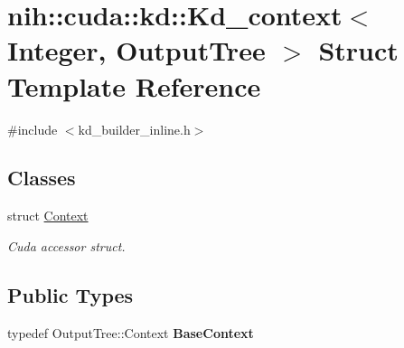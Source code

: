 \hypertarget{structnih_1_1cuda_1_1kd_1_1_kd__context}{
\section{nih\-:\-:cuda\-:\-:kd\-:\-:\-Kd\-\_\-context$<$ \-Integer, \-Output\-Tree $>$ \-Struct \-Template \-Reference}
\label{structnih_1_1cuda_1_1kd_1_1_kd__context}
}


{\ttfamily \#include $<$kd\-\_\-builder\-\_\-inline.\-h$>$}

\subsection*{\-Classes}
\begin{DoxyCompactItemize}
\item 
struct \hyperlink{structnih_1_1cuda_1_1kd_1_1_kd__context_1_1_context}{\-Context}
\begin{DoxyCompactList}\small\item\em \-Cuda accessor struct. \end{DoxyCompactList}\end{DoxyCompactItemize}
\subsection*{\-Public \-Types}
\begin{DoxyCompactItemize}
\item 
\hypertarget{structnih_1_1cuda_1_1kd_1_1_kd__context_ae666201099fed2c086017df8ce24ec29}{
typedef \-Output\-Tree\-::\-Context {\bfseries \-Base\-Context}}
\label{structnih_1_1cuda_1_1kd_1_1_kd__context_ae666201099fed2c086017df8ce24ec29}

\end{DoxyCompactItemize}
